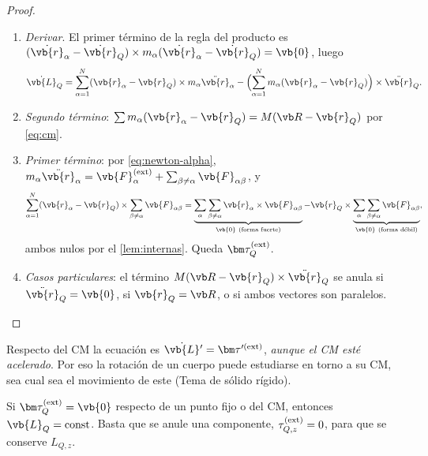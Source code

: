 \begin{proof}
\begin{enumerate}
  \item \emph{Derivar}. El primer término de la regla del producto es
  $(\dot{\vb{r}}_{\alpha}-\dot{\vb{r}}_{Q})\times m_{\alpha}(\dot{\vb{r}}_{\alpha}-\dot{\vb{r}}_{Q})=\vb{0}$, luego
  \[
    \dot{\vb{L}}_{Q}=\sa(\vb{r}_{\alpha}-\vb{r}_{Q})\times m_{\alpha}\ddot{\vb{r}}_{\alpha}
    -\Bigl(\sa m_{\alpha}(\vb{r}_{\alpha}-\vb{r}_{Q})\Bigr)\times\ddot{\vb{r}}_{Q}.
  \]
  \item \emph{Segundo término}: $\sum m_{\alpha}(\vb{r}_{\alpha}-\vb{r}_{Q})=M(\Rc-\vb{r}_{Q})$ por \eqref{eq:cm}.
  \item \emph{Primer término}: por \eqref{eq:newton-alpha},
  $m_{\alpha}\ddot{\vb{r}}_{\alpha}=\vb{F}_{\alpha}\ext+\sum_{\beta\neq\alpha}\vb{F}_{\alpha\beta}$, y
  \[
    \sa(\vb{r}_{\alpha}-\vb{r}_{Q})\times\sum_{\beta\neq\alpha}\vb{F}_{\alpha\beta}
    =\underbrace{\sum_{\alpha}\sum_{\beta\neq\alpha}\vb{r}_{\alpha}\times\vb{F}_{\alpha\beta}}_{\vb{0}\ (\text{forma fuerte})}
    -\vb{r}_{Q}\times\underbrace{\sum_{\alpha}\sum_{\beta\neq\alpha}\vb{F}_{\alpha\beta}}_{\vb{0}\ (\text{forma débil})},
  \]
  ambos nulos por el \cref{lem:internas}. Queda $\vtorque_{Q}\ext$.
  \item \emph{Casos particulares}: el término $M(\Rc-\vb{r}_{Q})\times\ddot{\vb{r}}_{Q}$ se
  anula si $\ddot{\vb{r}}_{Q}=\vb{0}$, si $\vb{r}_{Q}=\Rc$, o si ambos vectores son paralelos.\qedhere
\end{enumerate}
\end{proof}

\begin{observacion}
Respecto del CM la ecuación es $\dot{\vb{L}}{}'=\vtorque^{\prime(\mathrm{ext})}$, \emph{aunque el CM
esté acelerado}. Por eso la rotación de un cuerpo puede estudiarse en torno
a su CM, sea cual sea el movimiento de este (Tema de sólido rígido).
\end{observacion}

\begin{corolario}
\label{cor:conserva-L}
Si $\vtorque_{Q}\ext=\vb{0}$ respecto de un punto fijo o del CM, entonces
$\vb{L}_{Q}=\text{const}$. Basta que se anule una componente,
$\tau^{(\mathrm{ext})}_{Q,z}=0$, para que se conserve $L_{Q,z}$.
\end{corolario}

